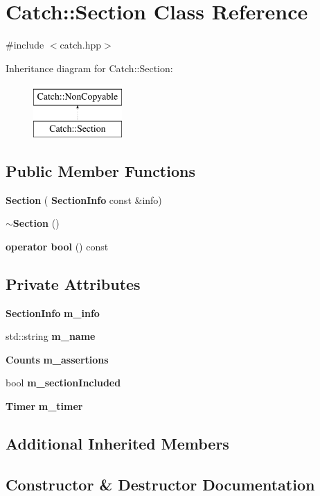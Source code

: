 \section{Catch\+::Section Class Reference}
\label{class_catch_1_1_section}


{\ttfamily \#include $<$catch.\+hpp$>$}

Inheritance diagram for Catch\+::Section\+:\begin{figure}[H]
\begin{center}
\leavevmode
\includegraphics[height=2.000000cm]{class_catch_1_1_section}
\end{center}
\end{figure}
\subsection*{Public Member Functions}
\begin{DoxyCompactItemize}
\item 
\textbf{ Section} (\textbf{ Section\+Info} const \&info)
\item 
\textbf{ $\sim$\+Section} ()
\item 
\textbf{ operator bool} () const
\end{DoxyCompactItemize}
\subsection*{Private Attributes}
\begin{DoxyCompactItemize}
\item 
\textbf{ Section\+Info} \textbf{ m\+\_\+info}
\item 
std\+::string \textbf{ m\+\_\+name}
\item 
\textbf{ Counts} \textbf{ m\+\_\+assertions}
\item 
bool \textbf{ m\+\_\+section\+Included}
\item 
\textbf{ Timer} \textbf{ m\+\_\+timer}
\end{DoxyCompactItemize}
\subsection*{Additional Inherited Members}


\subsection{Constructor \& Destructor Documentation}
\mbox{\label{class_catch_1_1_section_a68fd4e51e8981aaa7ddb00d8a6abd099}} 
